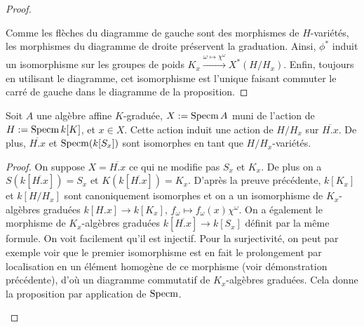\begin{proof}
\begin{multicols}{2}
	\columnbreak
	\begin{center}
	\end{center}
\end{multicols}
Comme les flèches du diagramme de gauche sont des morphismes de $H$-variétés, les morphismes du diagramme de droite préservent la graduation. Ainsi, $\phi^*$ induit un isomorphisme sur les groupes de poids $K_x \xrightarrow{\omega \mapsto\chi^{\omega}}X^*(H/H_x)$. Enfin, toujours en utilisant le diagramme, cet isomorphisme est l'unique faisant commuter le carré de gauche dans le diagramme de la proposition.
\end{proof}

\begin{prop}
Soit $A$ une algèbre affine $K$-graduée, $X:=\operatorname{Specm} A$ muni de l'action de $H:=\operatorname{Specm} k[K]$, et $x\in X$. Cette action induit une action de $H/H_x$ sur $\overline{H.x}$. De plus, $\overline{H.x}$ et $\operatorname{Specm}(k[S_x])$ sont isomorphes en tant que $H/H_x$-variétés.
\end{prop}
\begin{proof}
On suppose $X=\overline{H.x}$ ce qui ne modifie pas $S_x$ et $K_x$. De plus on a $S(k[\overline{H.x}])=S_x$ et $K(k[\overline{H.x}])=K_x$. D'après la preuve précédente, $k[K_x]$ et $k[H/H_x]$ sont canoniquement isomorphes et on a un isomorphisme de $K_x$-algèbres graduées $k[H.x]\rightarrow k[K_x],\, f_\omega \mapsto f_\omega(x)\chi^{\omega}$. On a également le morphisme de $K_x$-algèbres graduées $k[\overline{H.x}]\rightarrow k[S_x]$ définit par la même formule. On voit facilement qu'il est injectif. Pour la surjectivité, on peut par exemple voir que le premier isomorphisme est en fait le prolongement par localisation en un élément homogène de ce morphisme (voir démonstration précédente), d'où un diagramme commutatif de $K_x$-algèbres graduées. Cela donne la proposition par application de $\operatorname{Specm}$.

	\begin{center}
	\end{center}

\end{proof}

